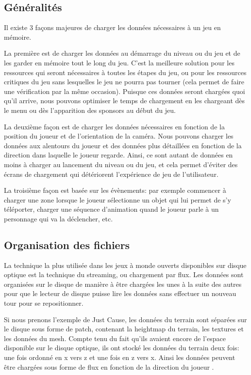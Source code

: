 \documentclass[a4paper, 11pt]{article} %
\begin{document}
\subsection*{Généralités}
Il existe 3 façons majeures de charger les données nécessaires à un jeu en mémoire.

La première est de charger les données au démarrage du niveau ou du jeu et de les garder en mémoire tout le long du jeu. C'est la meilleure solution pour les ressources qui seront nécessaires à toutes les étapes du jeu, ou pour les ressources critiques du jeu sans lesquelles le jeu ne pourra pas tourner (cela permet de faire une vérification par la même occasion). Puisque ces données seront chargées quoi qu'il arrive, nous pouvons optimiser le temps de chargement en les chargeant dès le menu ou dès l'apparition des sponsors au début du jeu.

La deuxième façon est de charger les données nécessaires en fonction de la position du joueur et de l'orientation de la caméra. Nous pouvons charger les données aux alentours du joueur et des données plus détaillées en fonction de la direction dans laquelle le joueur regarde. Ainsi, ce sont autant de données en moins à charger au lancement du niveau ou du jeu, et cela permet d'éviter des écrans de chargement qui détériorent l’expérience de jeu de l'utilisateur.

La troisième façon est basée sur les évènements: par exemple commencer à charger une zone lorsque le joueur sélectionne un objet qui lui permet de s'y téléporter, charger une séquence d'animation quand le joueur parle à un personnage qui va la déclencher, etc.

\newpage
\subsection*{Organisation des fichiers}
La technique la plus utilisée dans les jeux à monde ouverts disponibles sur disque optique est la technique du streaming, ou chargement par flux. Les données sont organisées sur le disque de manière à être chargées les unes à la suite des autres pour que le lecteur de disque puisse lire les données sans effectuer un nouveau tour pour se repositionner.

Si nous prenons l'exemple de Just Cause, les données du terrain sont séparées sur le disque sous forme de patch, contenant la heightmap du terrain, les textures et les données du mesh. Compte tenu du fait qu'ils avaient encore de l'espace disponible sur le disque optique, ils ont stocké les données du terrain deux fois: une fois ordonné en x vers z et une fois en z vers x. Ainsi les données peuvent être chargées sous forme de flux en fonction de la direction du joueur \cite{industry:justcause-streaming}.
\end{document}

